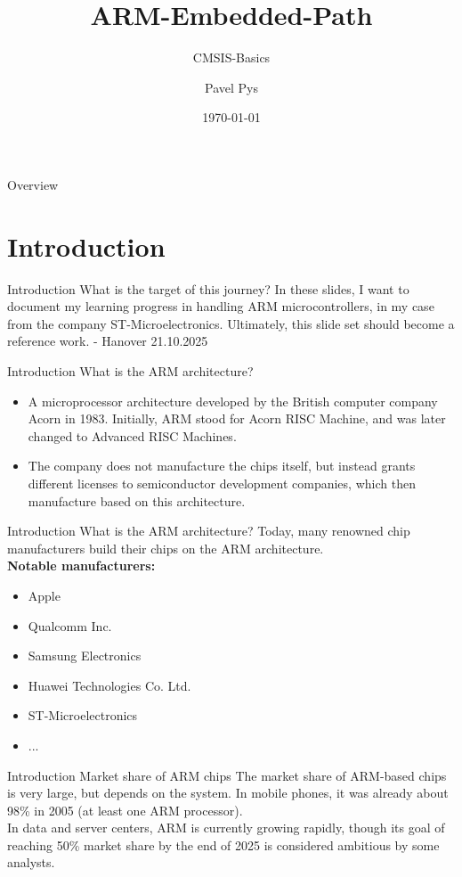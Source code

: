 \documentclass{beamer}
\title{ARM-Embedded-Path}
\subtitle{CMSIS-Basics}
\author{Pavel Pys}
\date{\today}
\begin{document}
	\begin{frame}
		\maketitle
	\end{frame}
	\begin{frame}{Overview}
		\tableofcontents
	\end{frame}
\section{Introduction}
\begin{frame}{Introduction}
	{What is the target of this journey?}
	In these slides, I want to document my learning progress in handling ARM microcontrollers, in my case from the company ST-Microelectronics. Ultimately, this slide set should become a reference work. - Hanover 21.10.2025
\end{frame}
\begin{frame}{Introduction}
	{What is the ARM architecture?}
	\begin{itemize}
		\item A microprocessor architecture developed by the British computer company Acorn in 1983. Initially, ARM stood for Acorn RISC Machine, and was later changed to Advanced RISC Machines.
		\item The company does not manufacture the chips itself, but instead grants different licenses to semiconductor development companies, which then manufacture based on this architecture.
	\end{itemize}
\end{frame}
\begin{frame}{Introduction}
	{What is the ARM architecture?}
	Today, many renowned chip manufacturers build their chips on the ARM architecture.\\
	\textbf{Notable manufacturers:}
	\begin{itemize}
		\item Apple
		\item Qualcomm Inc.
		\item Samsung Electronics
		\item Huawei Technologies Co. Ltd.
		\item ST-Microelectronics
		\item ...
	\end{itemize}
\end{frame}
\begin{frame}{Introduction}
	{Market share of ARM chips}
	The market share of ARM-based chips is very large, but depends on the system. In mobile phones, it was already about 98\% in 2005 (at least one ARM processor). \\
	\vspace{0.2cm}
	In data and server centers, ARM is currently growing rapidly, though its goal of reaching 50\% market share by the end of 2025 is considered ambitious by some analysts.
\end{frame}
\end{document}
